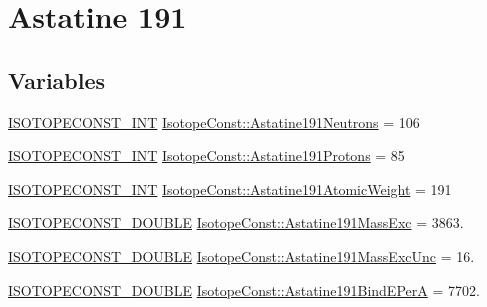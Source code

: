\hypertarget{group___isotope_const-_astatine-_at191}{}\section{Astatine 191}
\label{group___isotope_const-_astatine-_at191}
\subsection*{Variables}
\begin{DoxyCompactItemize}
\item 
\mbox{\hyperlink{group___isotope_const-_macros_ga5f18360b3e99483a35c32d789e62621c}{I\+S\+O\+T\+O\+P\+E\+C\+O\+N\+S\+T\+\_\+\+I\+NT}} \mbox{\hyperlink{group___isotope_const-_astatine-_at191_ga75de5318f0d982279dc521ab8e0b25a8}{Isotope\+Const\+::\+Astatine191\+Neutrons}} = 106
\item 
\mbox{\hyperlink{group___isotope_const-_macros_ga5f18360b3e99483a35c32d789e62621c}{I\+S\+O\+T\+O\+P\+E\+C\+O\+N\+S\+T\+\_\+\+I\+NT}} \mbox{\hyperlink{group___isotope_const-_astatine-_at191_ga8c1d738bdc8ee9935a2d9777047d5bf4}{Isotope\+Const\+::\+Astatine191\+Protons}} = 85
\item 
\mbox{\hyperlink{group___isotope_const-_macros_ga5f18360b3e99483a35c32d789e62621c}{I\+S\+O\+T\+O\+P\+E\+C\+O\+N\+S\+T\+\_\+\+I\+NT}} \mbox{\hyperlink{group___isotope_const-_astatine-_at191_gad53387889eaa28b1d75cf6107b710578}{Isotope\+Const\+::\+Astatine191\+Atomic\+Weight}} = 191
\item 
\mbox{\hyperlink{group___isotope_const-_macros_ga8f45a7272ce02c0b4c65c44636ed719a}{I\+S\+O\+T\+O\+P\+E\+C\+O\+N\+S\+T\+\_\+\+D\+O\+U\+B\+LE}} \mbox{\hyperlink{group___isotope_const-_astatine-_at191_ga2fa51c2af35a4201313e422bfb1be93d}{Isotope\+Const\+::\+Astatine191\+Mass\+Exc}} = 3863.
\item 
\mbox{\hyperlink{group___isotope_const-_macros_ga8f45a7272ce02c0b4c65c44636ed719a}{I\+S\+O\+T\+O\+P\+E\+C\+O\+N\+S\+T\+\_\+\+D\+O\+U\+B\+LE}} \mbox{\hyperlink{group___isotope_const-_astatine-_at191_ga79b42bf741098b1797484dbf3e3b8985}{Isotope\+Const\+::\+Astatine191\+Mass\+Exc\+Unc}} = 16.
\item 
\mbox{\hyperlink{group___isotope_const-_macros_ga8f45a7272ce02c0b4c65c44636ed719a}{I\+S\+O\+T\+O\+P\+E\+C\+O\+N\+S\+T\+\_\+\+D\+O\+U\+B\+LE}} \mbox{\hyperlink{group___isotope_const-_astatine-_at191_ga8e5c5fa80c241cbbc205228bdcdaadeb}{Isotope\+Const\+::\+Astatine191\+Bind\+E\+PerA}} = 7702.
\item 

\end{DoxyCompactItemize}
